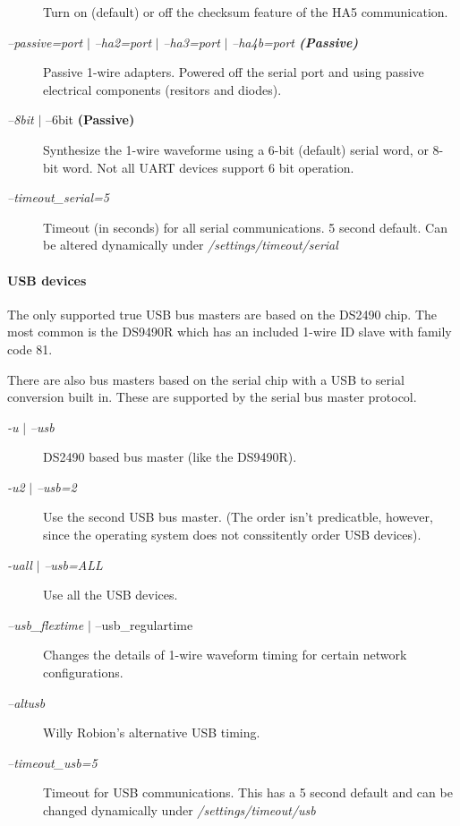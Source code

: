 \begin{description}
Turn on (default) or off the checksum feature of the HA5 communication.
 
\item [\textit{--passive=port} $|$ \textit{--ha2=port} $|$ \textit{--ha3=port} $|$ \textit{--ha4b=port \textbf{(Passive)\textbf{ }}}] Passive 1-wire adapters.
Powered off the serial port and using passive electrical components (resitors
and diodes). 
\item [\textit{--8bit} $|$ --6bit \textbf{(Passive)\textbf{ }}] 

Synthesize the 1-wire waveforme using a 6-bit (default) serial word, or 8-bit
word. Not all UART devices support 6 bit operation. 
\item [\textit{--timeout\_serial=5\textit{ }}] Timeout
(in seconds) for all serial communications. 5 second default. Can be altered
dynamically under  \textit{/settings/timeout/serial} 
\end{description}

\paragraph*{ USB devices}
The only supported
true USB bus masters are based on the DS2490 chip. The most common is the
DS9490R which has an included 1-wire ID slave with family code 81. 

There
are also bus masters based on the serial chip with a USB to serial conversion
built in. These are supported by the serial bus master protocol.  \begin{description}
\item [\textit{-u}  $|$ \textit{--usb
}] DS2490 based bus master (like the DS9490R). 
\item [\textit{-u2}  $|$ \textit{--usb=2 }] Use the second USB
bus master. (The order isn't predicatble, however, since the operating system
does not conssitently order USB devices). 
\item [\textit{-uall}  $|$ \textit{--usb=ALL }] Use all the USB
devices. 
\item [\textit{--usb\_flextime} $|$ --usb\_regulartime ] Changes the details of 1-wire waveform
timing for certain network configurations. 
\item [\textit{--altusb} ] Willy Robion's alternative
USB timing.  
\item [\textit{--timeout\_usb=5} ] Timeout for USB communications. This has a 5 second
default and can be changed dynamically under \textit{/settings/timeout/usb} 
\end{description}

